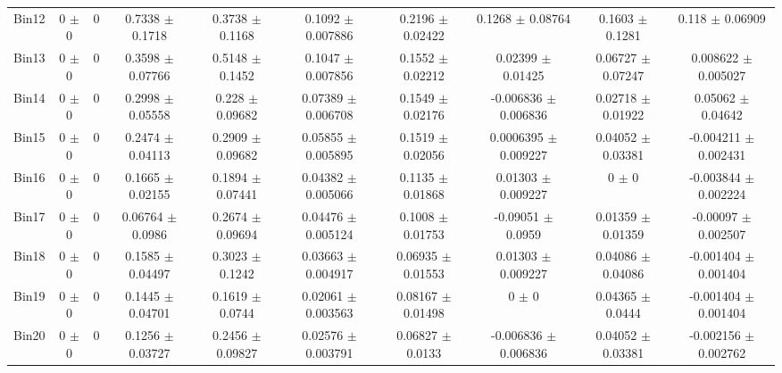 \begin{tabular}{@{\extracolsep{4pt}}lccccccccc@{}}
     Bin12 & 0 $\pm$ 0 & 0 & 0.7338 $\pm$ 0.1718 & 0.3738 $\pm$ 0.1168 & 0.1092 $\pm$ 0.007886 & 0.2196 $\pm$ 0.02422 & 0.1268 $\pm$ 0.08764 & 0.1603 $\pm$ 0.1281 & 0.118 $\pm$ 0.06909 \\ 
     Bin13 & 0 $\pm$ 0 & 0 & 0.3598 $\pm$ 0.07766 & 0.5148 $\pm$ 0.1452 & 0.1047 $\pm$ 0.007856 & 0.1552 $\pm$ 0.02212 & 0.02399 $\pm$ 0.01425 & 0.06727 $\pm$ 0.07247 & 0.008622 $\pm$ 0.005027 \\ 
     Bin14 & 0 $\pm$ 0 & 0 & 0.2998 $\pm$ 0.05558 & 0.228 $\pm$ 0.09682 & 0.07389 $\pm$ 0.006708 & 0.1549 $\pm$ 0.02176 & -0.006836 $\pm$ 0.006836 & 0.02718 $\pm$ 0.01922 & 0.05062 $\pm$ 0.04642 \\ 
     Bin15 & 0 $\pm$ 0 & 0 & 0.2474 $\pm$ 0.04113 & 0.2909 $\pm$ 0.09682 & 0.05855 $\pm$ 0.005895 & 0.1519 $\pm$ 0.02056 & 0.0006395 $\pm$ 0.009227 & 0.04052 $\pm$ 0.03381 & -0.004211 $\pm$ 0.002431 \\ 
     Bin16 & 0 $\pm$ 0 & 0 & 0.1665 $\pm$ 0.02155 & 0.1894 $\pm$ 0.07441 & 0.04382 $\pm$ 0.005066 & 0.1135 $\pm$ 0.01868 & 0.01303 $\pm$ 0.009227 & 0 $\pm$ 0 & -0.003844 $\pm$ 0.002224 \\ 
     Bin17 & 0 $\pm$ 0 & 0 & 0.06764 $\pm$ 0.0986 & 0.2674 $\pm$ 0.09694 & 0.04476 $\pm$ 0.005124 & 0.1008 $\pm$ 0.01753 & -0.09051 $\pm$ 0.0959 & 0.01359 $\pm$ 0.01359 & -0.00097 $\pm$ 0.002507 \\ 
     Bin18 & 0 $\pm$ 0 & 0 & 0.1585 $\pm$ 0.04497 & 0.3023 $\pm$ 0.1242 & 0.03663 $\pm$ 0.004917 & 0.06935 $\pm$ 0.01553 & 0.01303 $\pm$ 0.009227 & 0.04086 $\pm$ 0.04086 & -0.001404 $\pm$ 0.001404 \\ 
     Bin19 & 0 $\pm$ 0 & 0 & 0.1445 $\pm$ 0.04701 & 0.1619 $\pm$ 0.0744 & 0.02061 $\pm$ 0.003563 & 0.08167 $\pm$ 0.01498 & 0 $\pm$ 0 & 0.04365 $\pm$ 0.0444 & -0.001404 $\pm$ 0.001404 \\ 
     Bin20 & 0 $\pm$ 0 & 0 & 0.1256 $\pm$ 0.03727 & 0.2456 $\pm$ 0.09827 & 0.02576 $\pm$ 0.003791 & 0.06827 $\pm$ 0.0133 & -0.006836 $\pm$ 0.006836 & 0.04052 $\pm$ 0.03381 & -0.002156 $\pm$ 0.002762 \\ 
\hline\hline
  \end{tabular}
